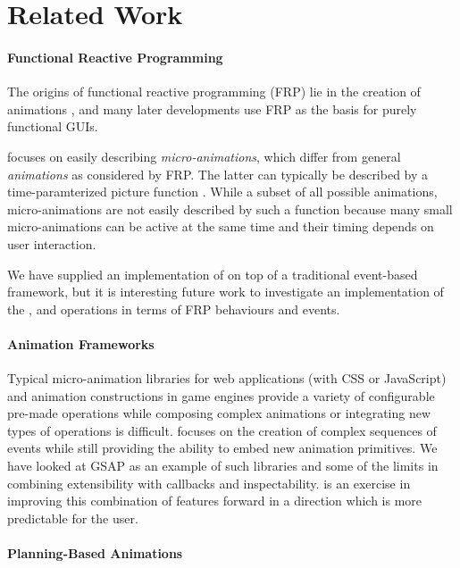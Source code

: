 \section{Related Work}
\label{sec:related}

\paragraph{Functional Reactive Programming}
The origins of functional reactive programming (FRP) lie in the creation of
animations \cite{DBLP:conf/icfp/ElliottH97}, and many later developments use
FRP as the basis for purely functional GUIs. 

\dsl{} focuses on easily describing \emph{micro-animations}, which differ from general
\emph{animations} as considered by FRP. The latter can typically be described
by a time-paramterized picture function . While a subset of
all possible animations, micro-animations are not easily described by such a
function because many small micro-animations can be active at the same time and
their timing depends on user interaction.

We have supplied an implementation of \dsl{} on top of a traditional
event-based framework, but it is interesting future work to investigate an
implementation of the ,  and 
operations in terms of FRP behaviours and events.

\paragraph{Animation Frameworks}

Typical micro-animation libraries for web applications (with CSS or JavaScript)
and animation constructions in game engines provide a variety of configurable
pre-made operations while composing complex animations or integrating new types
of operations is difficult. \dsl{} focuses on the creation of complex sequences
of events while still providing the ability to embed new animation primitives.
We have looked at GSAP as an example of such libraries and some of the limits
in combining extensibility with callbacks and inspectability. \dsl{} is an
exercise in improving this combination of features forward in a direction which
is more predictable for the user.

\paragraph{Planning-Based Animations}

